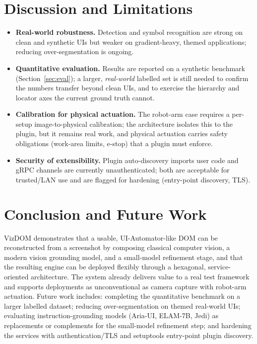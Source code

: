 \documentclass[11pt,a4paper]{article}
\begin{document}
\section{Discussion and Limitations}
\begin{itemize}[leftmargin=1.4em]
  \item \textbf{Real-world robustness.} Detection and symbol recognition are strong
        on clean and synthetic UIs but weaker on gradient-heavy, themed
        applications; reducing over-segmentation is ongoing.
  \item \textbf{Quantitative evaluation.} Results are reported on a synthetic
        benchmark (Section~\ref{sec:eval}); a larger, \emph{real-world} labelled set
        is still needed to confirm the numbers transfer beyond clean UIs, and to
        exercise the hierarchy and locator axes the current ground truth cannot.
  \item \textbf{Calibration for physical actuation.} The robot-arm case requires a
        per-setup image-to-physical calibration; the architecture isolates this to
        the plugin, but it remains real work, and physical actuation carries safety
        obligations (work-area limits, e-stop) that a plugin must enforce.
  \item \textbf{Security of extensibility.} Plugin auto-discovery imports user code
        and gRPC channels are currently unauthenticated; both are acceptable for
        trusted/LAN use and are flagged for hardening (entry-point discovery, TLS).
\end{itemize}

\section{Conclusion and Future Work}
VizDOM demonstrates that a usable, UI-Automator-like DOM can be reconstructed from a
screenshot by composing classical computer vision, a modern vision grounding model,
and a small-model refinement stage, and that the resulting engine can be deployed
flexibly through a hexagonal, service-oriented architecture. The system already
delivers value to a real test framework and supports deployments as unconventional
as camera capture with robot-arm actuation. Future work includes: completing the
quantitative benchmark on a larger labelled dataset; reducing over-segmentation on
themed real-world UIs; evaluating instruction-grounding models (Aria-UI, ELAM-7B,
Jedi) as replacements or complements for the small-model refinement step; and
hardening the services with authentication/TLS and setuptools entry-point plugin
discovery.



\end{document}

